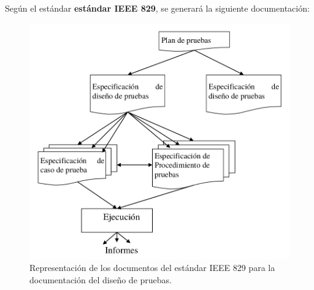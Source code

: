 Según el estándar \textbf{estándar IEEE 829}, se generará la siguiente documentación:

\begin{figure}[H]
    \centering
    \includegraphics[width=0.6\linewidth]{Resources/Tema6/IEEE_829.png}
    \caption{Representación de los documentos del estándar IEEE 829 para la documentación del diseño de pruebas.}
    \label{fig:IEEE829}
\end{figure}

